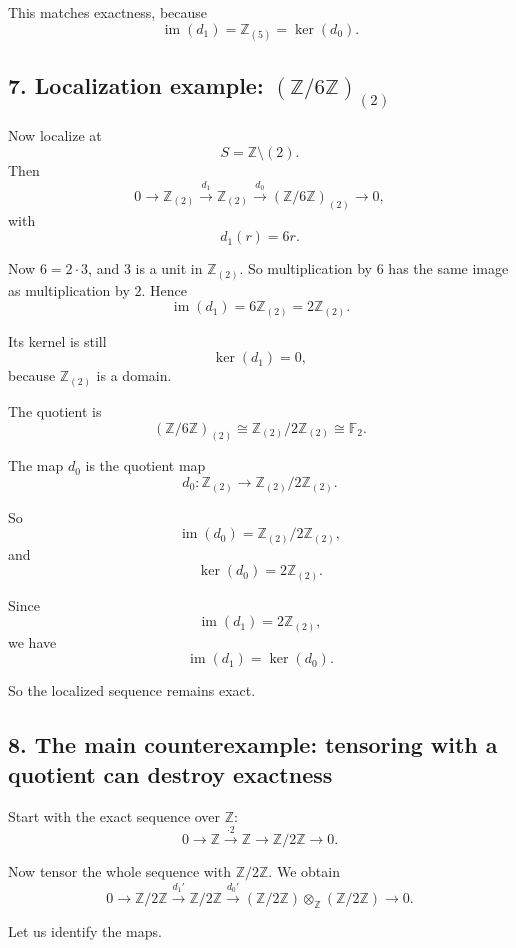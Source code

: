\documentclass[12pt,a4paper]{article}
\theoremstyle{notespace}
\theoremstyle{definition}
\begin{document}
This matches exactness, because
\[
\operatorname{im}(d_1)=\mathbb Z_{(5)}=\ker(d_0).
\]

\bigskip

\subsection{7. Localization example: \((\mathbb Z/6\mathbb Z)_{(2)}\)}

Now localize at
\[
S=\mathbb Z\setminus (2).
\]
Then
\[
0 \longrightarrow \mathbb Z_{(2)} \xrightarrow{d_1} \mathbb Z_{(2)} \xrightarrow{d_0} (\mathbb Z/6\mathbb Z)_{(2)} \longrightarrow 0,
\]
with
\[
d_1(r)=6r.
\]

Now \(6=2\cdot 3\), and \(3\) is a unit in \(\mathbb Z_{(2)}\). So multiplication by \(6\) has the same image as multiplication by \(2\). Hence
\[
\operatorname{im}(d_1)=6\mathbb Z_{(2)}=2\mathbb Z_{(2)}.
\]

Its kernel is still
\[
\ker(d_1)=0,
\]
because \(\mathbb Z_{(2)}\) is a domain.

The quotient is
\[
(\mathbb Z/6\mathbb Z)_{(2)}\cong \mathbb Z_{(2)}/2\mathbb Z_{(2)}\cong \mathbb F_2.
\]

The map \(d_0\) is the quotient map
\[
d_0:\mathbb Z_{(2)}\to \mathbb Z_{(2)}/2\mathbb Z_{(2)}.
\]

So
\[
\operatorname{im}(d_0)=\mathbb Z_{(2)}/2\mathbb Z_{(2)},
\]
and
\[
\ker(d_0)=2\mathbb Z_{(2)}.
\]

Since
\[
\operatorname{im}(d_1)=2\mathbb Z_{(2)},
\]
we have
\[
\operatorname{im}(d_1)=\ker(d_0).
\]

So the localized sequence remains exact.

\bigskip

\subsection{8. The main counterexample: tensoring with a quotient can destroy exactness}

Start with the exact sequence over \(\mathbb Z\):
\[
0 \longrightarrow \mathbb Z \xrightarrow{\cdot 2} \mathbb Z \longrightarrow \mathbb Z/2\mathbb Z \longrightarrow 0.
\]

Now tensor the whole sequence with \(\mathbb Z/2\mathbb Z\). We obtain
\[
0 \longrightarrow \mathbb Z/2\mathbb Z \xrightarrow{d_1'} \mathbb Z/2\mathbb Z
\xrightarrow{d_0'} (\mathbb Z/2\mathbb Z)\otimes_{\mathbb Z}(\mathbb Z/2\mathbb Z) \longrightarrow 0.
\]

Let us identify the maps.
\end{document}
